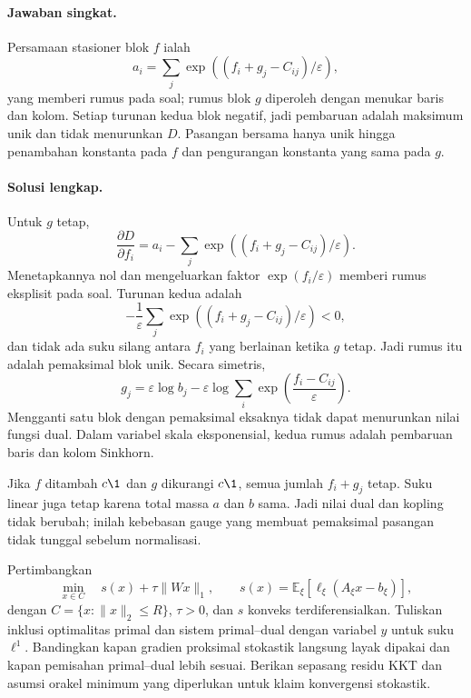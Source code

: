 \paragraph{Jawaban singkat.}
\label{orig03:final:answer:0007}
Persamaan stasioner blok $f$ ialah
\[
 a_i=\sum_j\exp((f_i+g_j-C_{ij})/\varepsilon),
\]
yang memberi rumus pada soal; rumus blok $g$ diperoleh dengan menukar baris
dan kolom. Setiap turunan kedua blok negatif, jadi pembaruan adalah maksimum
unik dan tidak menurunkan $D$. Pasangan bersama hanya unik hingga penambahan
konstanta pada $f$ dan pengurangan konstanta yang sama pada $g$.

\paragraph{Solusi lengkap.}
\label{orig03:final:solution:0007}
Untuk $g$ tetap,
\[
 \frac{\partial D}{\partial f_i}
 =a_i-\sum_j\exp((f_i+g_j-C_{ij})/\varepsilon).
\]
Menetapkannya nol dan mengeluarkan faktor $\exp(f_i/\varepsilon)$ memberi
rumus eksplisit pada soal. Turunan kedua adalah
\[
 -\frac1\varepsilon\sum_j
 \exp((f_i+g_j-C_{ij})/\varepsilon)<0,
\]
dan tidak ada suku silang antara $f_i$ yang berlainan ketika $g$ tetap. Jadi
rumus itu adalah pemaksimal blok unik. Secara simetris,
\[
 g_j=\varepsilon\log b_j-\varepsilon
 \log\sum_i\exp\!\left(\frac{f_i-C_{ij}}{\varepsilon}\right).
\]
Mengganti satu blok dengan pemaksimal eksaknya tidak dapat menurunkan nilai
fungsi dual. Dalam variabel skala eksponensial, kedua rumus adalah pembaruan
baris dan kolom Sinkhorn.

Jika $f$ ditambah $c\1$ dan $g$ dikurangi $c\1$, semua jumlah
$f_i+g_j$ tetap. Suku linear juga tetap karena total massa $a$ dan $b$ sama.
Jadi nilai dual dan kopling tidak berubah; inilah kebebasan gauge yang membuat
pemaksimal pasangan tidak tunggal sebelum normalisasi.

\begin{exercise}
\label{orig03:final:exercise:0008}
Pertimbangkan
\[
 \min_{x\in C}\quad
 s(x)+\tau\lVert Wx\rVert_1,
 \qquad
 s(x)=\mathbb E_\xi[\ell_\xi(A_\xi x-b_\xi)],
\]
dengan $C=\{x:\lVert x\rVert_2\le R\}$, $\tau>0$, dan $s$ konveks
terdiferensialkan. Tuliskan inklusi optimalitas primal dan sistem primal--dual
dengan variabel $y$ untuk suku $\ell^1$. Bandingkan kapan gradien proksimal
stokastik langsung layak dipakai dan kapan pemisahan primal--dual lebih
sesuai. Berikan sepasang residu KKT dan asumsi orakel minimum yang diperlukan
untuk klaim konvergensi stokastik.
\end{exercise}

